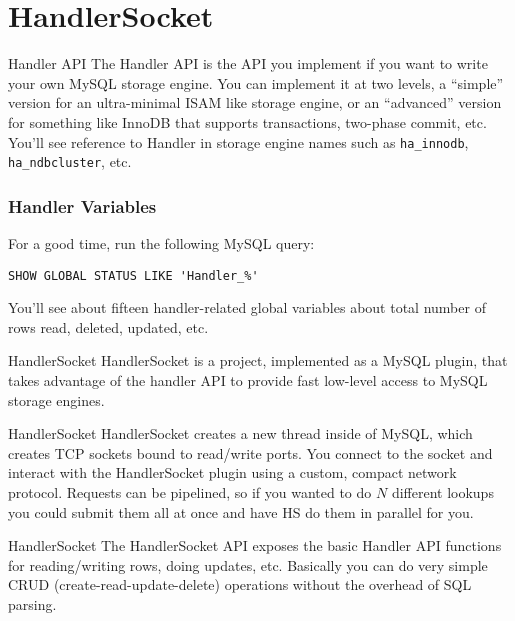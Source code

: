 \documentclass[14pt]{beamer}
\begin{document}
\section{HandlerSocket}

\begin{frame}{Handler API}
  The Handler API is the API you implement if you want to write your own MySQL
  storage engine. You can implement it at two levels, a ``simple'' version for
  an ultra-minimal ISAM like storage engine, or an ``advanced'' version for
  something like InnoDB that supports transactions, two-phase commit, etc.
  \newline
  \newline
  \pause
  You'll see reference to Handler in storage engine names such as
  \texttt{ha\_innodb}, \texttt{ha\_ndbcluster}, etc.
\end{frame}

\begin{frame}[fragile]
  \frametitle{Handler Variables}
  For a good time, run the following MySQL query:
\begin{verbatim}
SHOW GLOBAL STATUS LIKE 'Handler_%'
\end{verbatim}
  You'll see about fifteen handler-related global variables about total number
  of rows read, deleted, updated, etc.
\end{frame}

\begin{frame}{HandlerSocket}
  HandlerSocket is a project, implemented as a MySQL plugin, that takes
  advantage of the handler API to provide fast low-level access to MySQL storage
  engines.
\end{frame}

\begin{frame}{HandlerSocket}
  HandlerSocket creates a new thread inside of MySQL, which creates TCP sockets
  bound to read/write ports.
  \newline
  \newline
  You connect to the socket and interact with the HandlerSocket plugin using a
  custom, compact network protocol. Requests can be pipelined, so if you wanted
  to do $N$ different lookups you could submit them all at once and have HS do
  them in parallel for you.
\end{frame}

\begin{frame}{HandlerSocket}
  The HandlerSocket API exposes the basic Handler API functions for
  reading/writing rows, doing updates, etc.
  \newline
  \newline
  Basically you can do very simple CRUD (create-read-update-delete) operations
  without the overhead of SQL parsing.
\end{frame}
\end{document}
